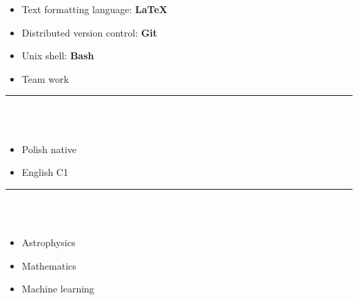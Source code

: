 \documentclass[10pt]{article}
\begin{document}
\begin{minipage}[t]{0.30\textwidth}
\begin{itemize}[leftmargin=*]
            \item Text formatting language: \textbf{LaTeX}
            \item Distributed version control: \textbf{Git}
            \item Unix shell: \textbf{Bash} 
            \item Team work
        \end{itemize}
        \rule{6cm}{1pt} \\ \\
        \fontsize{10pt}{10pt}
        \begin{itemize}[leftmargin=*]
            \setlength{\parskip}{0pt}
            \item Polish native
            \item English C1
        \end{itemize}
        \rule{6cm}{1pt} \\ \\
        \fontsize{10pt}{10pt}
        \begin{itemize}[leftmargin=*]
            \setlength{\parskip}{0pt}
            \item Astrophysics
            \item Mathematics
            \item Machine learning
        \end{itemize}
    \end{minipage}
    \hfill %
\end{document}
